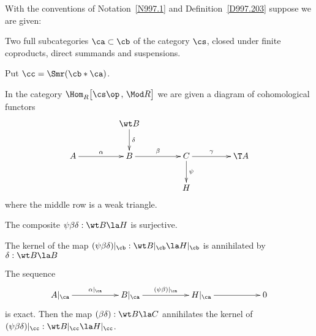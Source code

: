 \documentclass[11pt]{amsart}
\begin{document}
With the conventions of Notation~\ref{N997.1}
and Definition~\ref{D997.203}
suppose we are given:
\be
\item
Two full subcategories $\ca\subset\cb$ of the category $\cs$, closed under
finite coproducts, direct summands and
suspensions.
\item
Put $\cc=\Smr(\cb*\ca)$.
\item
In the category $\Hom_R^{}\big[\cs\op\,,\,\Mod R\big]$ we are given a diagram
of cohomological functors
\[\xymatrix@C+20pt{
                  & \wt B\ar[d]^-\delta  \\
A\ar[r]^-{\alpha} & B\ar[r]^-{\beta} & C\ar[r]^-{\gamma}\ar[d]^-\psi & \T A\\
  & & H
}\]
where the middle row is a weak triangle.
\item
The composite $\psi\beta\delta:\wt B\la H$ is surjective.
\item
The kernel of the map $(\psi\beta\delta)|_\cb:\wt B|_\cb\la H|_\cb$
is annihilated by $\delta:\wt B\la B$
\item
The sequence
\[\xymatrix@C+30pt{
A|_\ca\ar[r]^-{\alpha|_\ca} & B|_\ca\ar[r]^-{(\psi\beta)|_\ca} & H|_\ca\ar[r] &0
}\]
is exact.
\setcounter{enumiv}{\value{enumi}}
\ee
Then the map $(\beta\delta):\wt B\la C$ annihilates the kernel of
$(\psi\beta\delta)|_\cc:\wt B|_\cc\la H|_\cc$.
\elem
\end{document}
